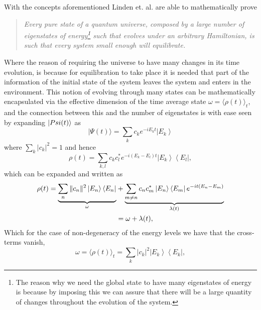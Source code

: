 \indent With the concepts aforementioned Linden et. al.  \cite{linden_quantum_2009} are able to mathematically prove
\begin{quote}
\textit{Every pure state of a quantum universe, composed by a large number of eigenstates of energy\footnote{The reason why we need the global state to have many eigenstates of energy is because by imposing this we can assure that there will be a large quantity of changes throughout the evolution of the system.} such that evolves under an arbitrary Hamiltonian, is such that every system small enough will equilibrate.}
\end{quote}
\indent Where the reason of requiring the universe to have many changes in its time evolution, is because for equilibration to take place it is needed that part of the information of the initial state of the system leaves the system and enters in the environment. This notion of evolving through many states can be mathematically encapsulated via the effective dimension of the time average state $\omega=\langle\rho(t)\rangle_{t}$, and the connection between this and the number of eigenstates is with ease seen by expanding $\mathinner{|{Psi(t)}\rangle}$ as
\begin{equation}
|\Psi(t)\rangle=\sum_{k} c_{k} e^{-i E_{k} t}\left|E_{k}\right\rangle
\label{CH1:expansion_1}
\end{equation}
where $\sum_{k}\left|c_{k}\right|^{2}=1$ and hence
\begin{equation}
\rho(t)=\sum_{k, l} c_{k} c_{l}^{*} e^{-i\left(E_{k}-E_{l}\right) t}\left|E_{k}\right\rangle\left\langle E_{l}\right|,
\label{CH1:expansion_2}
\end{equation}
which can be expanded and written as
\begin{equation}
\begin{aligned}
\rho(t)=\underbrace{\sum_{n}\|c_{n}\|^{2}\mathinner{|{E_{n}}\rangle}\mathinner{\langle{E_{n}}|}}_{\omega}&+\underbrace{\sum_{m \neq n} c_{n} c_{m}^{*}\mathinner{|{E_{n}}\rangle}\mathinner{\langle{E_{m}}|} e^{-i t\left(E_{n}-E_{m}\right)}}_{\lambda (t)} \\
&=\omega+\lambda(t),
\end{aligned}
\label{CH1:Expansion_to_use_after}
\end{equation}
\indent Which for the case of non-degeneracy of the energy levels we have that the cross-terms vanish,
\begin{equation}
\omega=\langle\rho(t)\rangle_{t}=\sum_{k}\left|c_{k}\right|^{2}\left|E_{k}\right\rangle\left\langle E_{k}\right|,
\label{CH1:expansion_3}
\end{equation}
